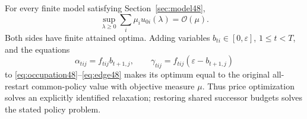\begin{theorem}\label{thm:flow}
For every finite model satisfying Section~\ref{sec:model48},
\begin{equation}\label{eq:duality48}
 \sup_{\lambda\ge0}\sum_i\mu_i u_{0i}(\lambda)=\mathcal O(\mu).
\end{equation}
Both sides have finite attained optima. Adding variables $b_{ti}\in[0,\varepsilon]$, $1\le t<T$, and the equations
\begin{equation}\label{eq:shared48}
 \alpha_{tij}=f_{tij}b_{t+1,j},\qquad
 \gamma_{tij}=f_{tij}(\varepsilon-b_{t+1,j})
\end{equation}
to \eqref{eq:occupation48}--\eqref{eq:edge48} makes its optimum equal to the original all-restart common-policy value with objective measure $\mu$. Thus price optimization solves an explicitly identified relaxation; restoring shared successor budgets solves the stated policy problem.
\end{theorem}
